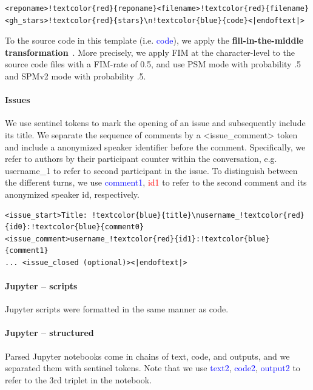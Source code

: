 \documentclass[10pt]{article} %
\begin{document}
\begin{Verbatim}[commandchars=!\{\}]
<reponame>!textcolor{red}{reponame}<filename>!textcolor{red}{filename}<gh_stars>!textcolor{red}{stars}\n!textcolor{blue}{code}<|endoftext|>
\end{Verbatim}

To the source code in this template (i.e. \textcolor{blue}{code}), we apply the \textbf{fill-in-the-middle transformation}~\citep[FIM;][]{bavarian2022fim}. More precisely, we apply FIM at the character-level to the source code files with a FIM-rate of 0.5, and use PSM mode with probability .5 and SPMv2 mode with probability .5. 

\paragraph{Issues} We use sentinel tokens to mark the opening of an issue and subsequently include its title. We separate the sequence of comments by a <issue\_comment> token and include a anonymized speaker identifier before the comment. Specifically, we refer to authors by their participant counter within the conversation, e.g.  username\_1 to refer to second participant in the issue. To distinguish between the different turns, we use \textcolor{blue}{comment1}, \textcolor{red}{id1} to refer to the second comment and its anonymized speaker id, respectively. 

\begin{Verbatim}[commandchars=!\{\}]
<issue_start>Title: !textcolor{blue}{title}\nusername_!textcolor{red}{id0}:!textcolor{blue}{comment0}<issue_comment>username_!textcolor{red}{id1}:!textcolor{blue}{comment1}
... <issue_closed (optional)><|endoftext|>
\end{Verbatim}


\paragraph{Jupyter -- scripts}

Jupyter scripts were formatted in the same manner as code.

\paragraph{Jupyter -- structured} Parsed Jupyter notebooks come in chains of text, code, and outputs, and we separated them with sentinel tokens. Note that we use \textcolor{blue}{text2}, \textcolor{blue}{code2}, \textcolor{blue}{output2} to refer to the 3rd triplet in the notebook.  
\end{document}
